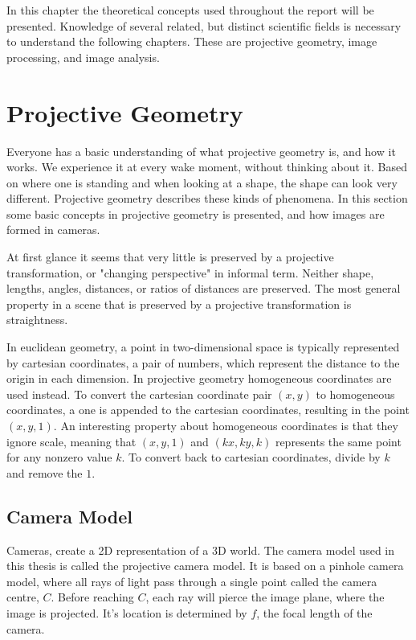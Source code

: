 In this chapter the theoretical concepts used throughout the report will be presented. Knowledge of several related, but distinct scientific fields is necessary to understand the following chapters. These are projective geometry, image processing, and image analysis.
\section{Projective Geometry}
Everyone has a basic understanding of what projective geometry is, and how it works.
We experience it at every wake moment, without thinking about it. 
Based on where one is standing and when looking at a shape, the shape can look very different. %
Projective geometry describes these kinds of phenomena.
In this section some basic concepts in projective geometry is presented, and how images are formed in cameras.

At first glance it seems that very little is preserved by a projective transformation, or "changing perspective" in informal term.
Neither shape, lengths, angles, distances, or ratios of distances are preserved.
The most general property in a scene that is preserved by a projective transformation is straightness. \cite[1]{hartley-zisserman}

In euclidean geometry, a point in two-dimensional space is typically represented by cartesian coordinates, a pair of numbers, which represent the distance to the origin in each dimension. %
In projective geometry homogeneous coordinates are used instead.
To convert the cartesian coordinate pair $(x,y)$ to homogeneous coordinates, a one is appended to the cartesian coordinates, resulting in the point $(x,y,1)$. 
An interesting property about homogeneous coordinates is that they ignore scale, meaning that $(x,y,1)$ and $(kx,ky,k)$ represents the same point for any nonzero value $k$.
To convert back to cartesian coordinates, divide by $k$ and remove the $1$.\cite[2]{hartley-zisserman} %

\subsection{Camera Model}\label{camera-model}
Cameras, create a 2D representation of a 3D world.
The camera model used in this thesis is called the projective camera model.
It is based on a pinhole camera model, where all rays of light pass through a single point called the camera centre, $C$. Before reaching $C$, each ray will pierce the image plane, where the image is projected.
It's location is determined by $f$, the focal length of the camera.

